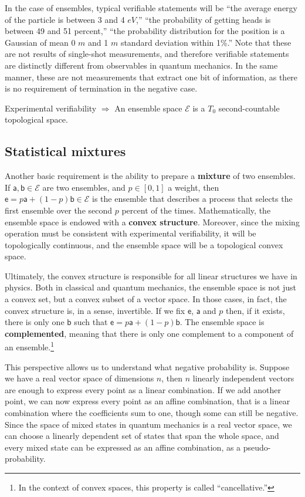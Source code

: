 \documentclass[10pt,twocolumn, nofootinbib]{revtex4-2}
\newcommand{\ens}[1][e] {\mathsf{#1}} %
\newcommand{\Ens}[1][E] {\mathcal{#1}} %
\begin{document}
In the case of ensembles, typical verifiable statements will be ``the average energy of the particle is between 3 and 4 $eV$,'' ``the probability of getting heads is between 49 and 51 percent,'' ``the probability distribution for the position is a Gaussian of mean 0 $m$ and 1 $m$ standard deviation within 1\%.'' Note that these are not results of single-shot measurements, and therefore verifiable statements are distinctly different from observables in quantum mechanics. In the same manner, these are not measurements that extract one bit of information, as there is no requirement of termination in the negative case.

\begin{tcolorbox}[colback=white, colframe=black]
	Experimental verifiability $\Rightarrow$ An ensemble space $\Ens$ is a $T_0$ second-countable topological space.
\end{tcolorbox}


\subsection{Statistical mixtures}
Another basic requirement is the ability to prepare a \textbf{mixture} of two ensembles. If $\ens[a], \ens[b] \in \Ens$ are two ensembles, and $p \in [0,1]$ a weight, then $\ens = p \ens[a] + (1-p) \ens[b] \in \Ens$ is the ensemble that describes a process that selects the first ensemble over the second $p$ percent of the times. Mathematically, the ensemble space is endowed with a \textbf{convex structure}. Moreover, since the mixing operation must be consistent with experimental verifiability, it will be topologically continuous, and the ensemble space will be a topological convex space.

Ultimately, the convex structure is responsible for all linear structures we have in physics. Both in classical and quantum mechanics, the ensemble space is not just a convex set, but a convex subset of a vector space. In those cases, in fact, the convex structure is, in a sense, invertible. If we fix $\ens$, $\ens[a]$ and $p$ then, if it exists, there is only one $\ens[b]$ such that $\ens = p \ens[a] + (1-p) \ens[b]$. The ensemble space is \textbf{complemented}, meaning that there is only one complement to a component of an ensemble.\footnote{In the context of convex spaces, this property is called ``cancellative.''}

This perspective allows us to understand what negative probability is. Suppose we have a real vector space of dimensions $n$, then $n$ linearly independent vectors are enough to express every point as a linear combination. If we add another point, we can now express every point as an affine combination, that is a linear combination where the coefficients sum to one, though some can still be negative. Since the space of mixed states in quantum mechanics is a real vector space, we can choose a linearly dependent set of states that span the whole space, and every mixed state can be expressed as an affine combination, as a pseudo-probability.
\end{document}
